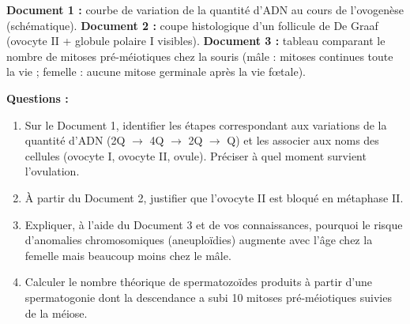 \documentclass[11pt]{article}
\begin{document}
\begin{exercice}
\textbf{Document 1 :} courbe de variation de la quantité d'ADN au cours de l'ovogenèse (schématique).
\textbf{Document 2 :} coupe histologique d'un follicule de De Graaf (ovocyte II + globule polaire I visibles).
\textbf{Document 3 :} tableau comparant le nombre de mitoses pré-méiotiques chez la souris (mâle : mitoses continues toute la vie ; femelle : aucune mitose germinale après la vie fœtale).

\textbf{Questions :}
\begin{enumerate}
    \item Sur le Document 1, identifier les étapes correspondant aux variations de la quantité d'ADN (2Q $\rightarrow$ 4Q $\rightarrow$ 2Q $\rightarrow$ Q) et les associer aux noms des cellules (ovocyte I, ovocyte II, ovule). Préciser à quel moment survient l'ovulation.
    \item À partir du Document 2, justifier que l'ovocyte II est bloqué en métaphase II.
    \item Expliquer, à l'aide du Document 3 et de vos connaissances, pourquoi le risque d'anomalies chromosomiques (aneuploïdies) augmente avec l'âge chez la femelle mais beaucoup moins chez le mâle.
    \item Calculer le nombre théorique de spermatozoïdes produits à partir d'une spermatogonie dont la descendance a subi 10 mitoses pré-méiotiques suivies de la méiose.
\end{enumerate}
\end{exercice}
\end{document}

